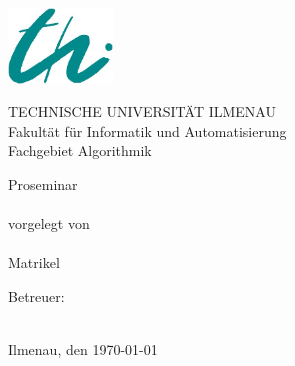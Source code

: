\begin{titlepage}

\begin{center}
\includegraphics[height=2cm]{pics/logo-thi.jpg}
\vspace{1cm}

TECHNISCHE UNIVERSITÄT ILMENAU\\
Fakultät für Informatik und Automatisierung\\
Fachgebiet Algorithmik

\vspace{4cm}

{\large Proseminar} \\ 
\vspace{1cm}
{\LARGE \normalfont \bfseries \sathema} \\
\vspace{1cm}
{vorgelegt von} \\
\vspace{0.5cm}
{\large \saauthor}\\
{\large Matrikel \matrikel}
\vspace{2cm}

Betreuer: \\
\vspace{0.5cm}
\saprof \\

\vspace{1cm}

Ilmenau, den \today
\end{center}

\end{titlepage}

